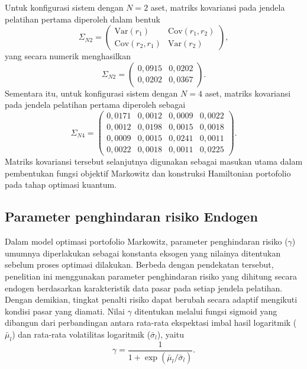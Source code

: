 Untuk konfigurasi sistem dengan $N=2$ aset, matriks kovariansi pada jendela pelatihan pertama diperoleh dalam bentuk
\begin{equation}
\Sigma_{N2}
=
\begin{pmatrix}
\mathrm{Var}(r_1) & \mathrm{Cov}(r_1,r_2) \\
\mathrm{Cov}(r_2,r_1) & \mathrm{Var}(r_2)
\end{pmatrix},
\end{equation}
yang secara numerik menghasilkan
\begin{equation}
\Sigma_{N2}
=
\begin{pmatrix}
0,0915 & 0,0202 \\
0,0202 & 0,0367
\end{pmatrix}.
\end{equation}
Sementara itu, untuk konfigurasi sistem dengan $N=4$ aset, matriks kovariansi pada jendela pelatihan pertama diperoleh sebagai
\begin{equation}
\Sigma_{N4}
=
\begin{pmatrix}
0,0171 & 0,0012 & 0,0009 & 0,0022 \\
0,0012 & 0,0198 & 0,0015 & 0,0018 \\
0,0009 & 0,0015 & 0,0241 & 0,0011 \\
0,0022 & 0,0018 & 0,0011 & 0,0225
\end{pmatrix}.
\end{equation}
Matriks kovariansi tersebut selanjutnya digunakan sebagai masukan utama dalam pembentukan fungsi objektif Markowitz dan konstruksi Hamiltonian portofolio pada tahap optimasi kuantum.


\subsection{Parameter penghindaran risiko Endogen}
\label{subsec:4_1_3_risk_aversion}

Dalam model optimasi portofolio Markowitz, parameter penghindaran risiko ($\gamma$) umumnya diperlakukan sebagai konstanta eksogen yang nilainya ditentukan sebelum proses optimasi dilakukan. Berbeda dengan pendekatan tersebut, penelitian ini menggunakan parameter penghindaran risiko yang dihitung secara endogen berdasarkan karakteristik data pasar pada setiap jendela pelatihan. Dengan demikian, tingkat penalti risiko dapat berubah secara adaptif mengikuti kondisi pasar yang diamati. Nilai $\gamma$ ditentukan melalui fungsi sigmoid yang dibangun dari perbandingan antara rata-rata ekspektasi imbal hasil logaritmik ($\bar{\mu}_l$) dan rata-rata volatilitas logaritmik ($\bar{\sigma}_l$), yaitu
\begin{equation}
\gamma =
\frac{1}
{1+\exp\left(\bar{\mu}_l/\bar{\sigma}_l\right)}.
\end{equation}

